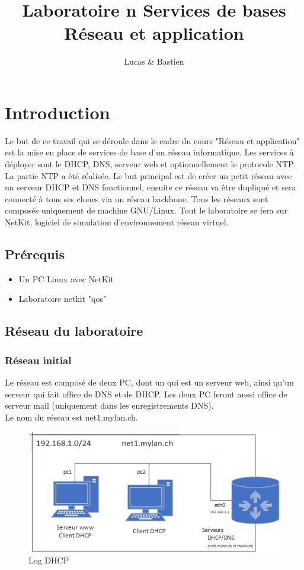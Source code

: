 \documentclass{article}
\title{%
	Laboratoire n\degre 6 Services de bases\\
	\large Réseau et application
}
\author{\bsc{Bulloni} Lucas \& \bsc{Wermeille} Bastien}
\begin{document}
\maketitle

\newpage

\tableofcontents

\newpage

\section{Introduction}
Le but de ce travail qui se déroule dans le cadre du cours "Réseau et application" est la mise en place de services de base d'un réseau informatique. Les services à déployer sont le DHCP, DNS, serveur web et optionnellement le protocole NTP. La partie NTP a été réalisée. Le but principal est de créer un petit réseau avec un serveur DHCP et DNS fonctionnel, ensuite ce réseau va être dupliqué et sera connecté à tous ses clones via un réseau backbone. Tous les réseaux sont composés uniquement de machine GNU/Linux. Tout le laboratoire se fera sur NetKit, logiciel de simulation d'environnement réseau virtuel.

\subsection{Prérequis}
\begin{itemize}
	\item Un PC Linux avec NetKit
	\item Laboratoire netkit "qos"
\end{itemize}
\subsection{Réseau du laboratoire}

\subsubsection{Réseau initial}
Le réseau est composé de deux PC, dont un qui est un serveur web, ainsi qu'un serveur qui fait office de DNS et de DHCP. Les deux PC feront aussi office de serveur mail (uniquement dans les enregistrements DNS).\\

Le nom du réseau est net1.mylan.ch.\\

\begin{figure}[!h]
	\centering
	\includegraphics{./schemas/Schema-simple.png}
	\caption{Log DHCP}
	\label{fig:Log DHCP}
\end{figure}
\end{document}
